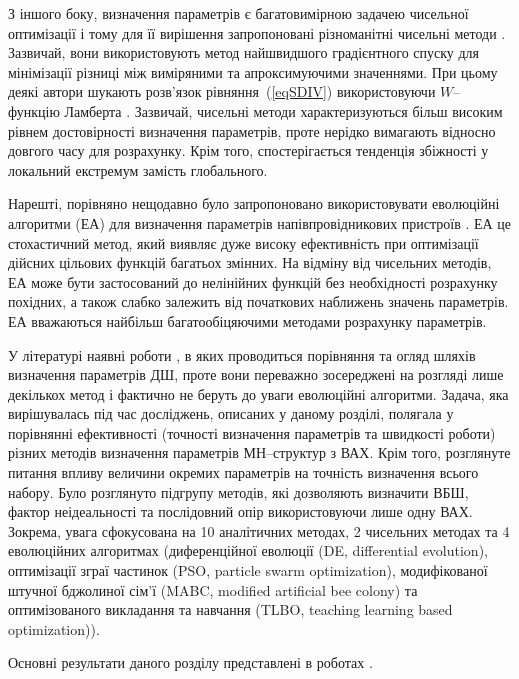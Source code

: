 \documentclass[a4paper,14pt,oneside,openany]{memoir}
\begin{document}
З іншого боку, визначення параметрів є багатовимірною задачею чисельної оптимізації і тому для її вирішення запропоновані різноманітні чисельні методи \cite{Ortiz1999,Evangelou,Donoval,Ferhat}.
Зазвичай, вони використовують метод найшвидшого градієнтного спуску для мінімізації різниці між виміряними та апроксимуючими значеннями.
При цьому деякі автори\cite{Lambert_Jung,Ortiz2005} шукають розв'язок рівняння~(\ref{eqSDIV}) використовуючи $W$--функцію Ламберта
\cite{LambertBook}.
Зазвичай, чисельні методи характеризуються більш високим рівнем достовірності визначення параметрів, проте нерідко вимагають відносно довгого часу для розрахунку.
Крім того, спостерігається тенденція збіжності у локальний екстремум замість глобального.

Нарешті, порівняно нещодавно було запропоновано використовувати еволюційні алгоритми (ЕА) для визначення параметрів напівпровідникових пристроїв \cite{PSO_Ye,DEWang,GA_Li,P-DE_Ishaque,TLBO_Patel,MABC,PSOWang,GA_Schottky}.
ЕА це стохастичний метод, який виявляє дуже високу ефективність при оптимізації дійсних цільових функцій багатьох змінних.
На відміну від чисельних методів, ЕА може бути застосований до нелінійних функцій без необхідності розрахунку похідних, а також слабко залежить від початкових наближень значень параметрів.
ЕА вважаються \cite{P-DE_Ishaque} найбільш багатообіцяючими  методами розрахунку параметрів.

У літературі наявні роботи \cite{Evangelou,Aubry,Kudryk}, в яких проводиться порівняння  та огляд шляхів визначення параметрів ДШ, проте вони переважно зосереджені на розгляді лише декількох метод і фактично не беруть до уваги еволюційні алгоритми.
Задача, яка вирішувалась під час досліджень, описаних у даному розділі, полягала у порівнянні ефективності (точності визначення параметрів та швидкості роботи) різних методів визначення параметрів МН--структур з ВАХ.
Крім того, розглянуте питання впливу величини окремих параметрів на точність визначення всього набору.
Було розглянуто підгрупу методів, які дозволяють визначити ВБШ, фактор неідеальності та послідовний опір використовуючи лише одну ВАХ.
Зокрема, увага сфокусована на 10 аналітичних методах, 2 чисельних методах та 4 еволюційних алгоритмах
(диференційної еволюції (DE, differential evolution),
оптимізації зграї частинок (PSO, particle swarm optimization),
модифікованої штучної бджолиної сім'ї (MABC, modified artificial bee colony) та
оптимізованого викладання та навчання (TLBO, teaching learning based optimization)).


Основні результати даного розділу представлені в роботах \cite{Olikh:Rev,6CPFCS}.
\end{document}
